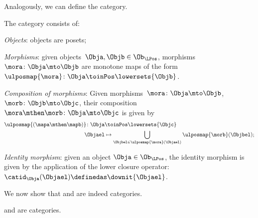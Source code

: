Analogously, we can define the \LPos category.
\begin{definition}
\label{def:lpos_cat}
The category \LPos consists of:
\begin{compactenum}
    \item \emph{Objects}: objects are posets;
    \item \emph{Morphisms}: given objects~$\Obja,\Objb\in \Ob_{\LPos}$, morphisms~$\mora\colon \Obja\mto \Objb$ are monotone maps of the form~$\ulposmap{\mora} \colon \Obja \toinPos \lowersets{\Objb}$.
    \item \emph{Composition of morphisms}: Given morphisms~$\mora \colon \Obja \mto \Objb$,~$\morb \colon \Objb\mto \Objc$, their composition~$\mora\mthen \morb\colon \Obja\mto \Objc$ is given by
    \begin{equation}
    \begin{aligned}
       \ulposmap{(\mapa \mthen \mapb)} \colon \Obja &\toinPos \lowersets{\Objc}\\
        \Objael&\mapsto \bigcup_{\Objbel\in \ulposmap{\mora} (\Objael)}\ulposmap{\morb}(\Objbel);
    \end{aligned}
    \end{equation}
    \item \emph{Identity morphism}: given an object $\Obja\in \Ob_{\LPos}$, the identity morphism is given by the application of the lower closure operator:~$\catid_\Obja(\Objael)\definedas \downit\{\Objael\}$.
\end{compactenum}
\end{definition}

We now show that \UPos and \LPos are indeed categories.

\begin{lemma}
\label{lem:upos_lpos_cats}
\UPos and \LPos are categories.
\end{lemma}

